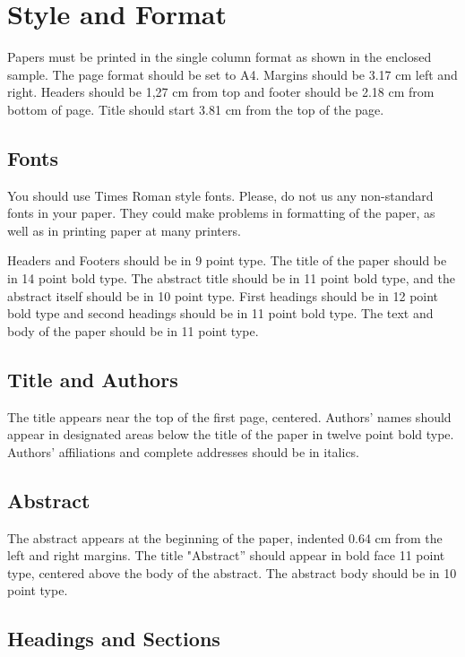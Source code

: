 \documentclass[twoside, 11pt, a4paper]{article}
\begin{document}
\section{Style and Format}

Papers must be printed in the single column format as shown in the enclosed sample. The page format should be set to A4. Margins should be 3.17 cm left and right. Headers should be 1,27 cm from top and footer should be 2.18 cm from bottom of page. Title should start 3.81 cm from the top of the page. 

\subsection{Fonts}

You should use Times Roman style fonts. Please, do not us any non-standard fonts in your paper. They could make problems in formatting of the paper, as well as in printing paper at many printers.

Headers and Footers should be in 9 point type. The title of the paper should be in 14 point bold type. The abstract title should be in 11 point bold type, and the abstract itself should be in 10 point type. First headings should be in 12 point bold type and second headings should be in 11 point bold type. The text and body of the paper should be in 11 point type.

\subsection{Title and Authors}

The title appears near the top of the first page, centered. Authors' names should appear in designated areas below the title of the paper in twelve point bold type. Authors' affiliations and complete addresses should be in italics. 

\subsection{Abstract}

The abstract appears at the beginning of the paper, indented 0.64 cm from the left and right margins. The title "Abstract'' should appear in bold face 11 point type, centered above the body of the abstract. The abstract body should be in 10 point type. 

\subsection{Headings and Sections}
\end{document}
